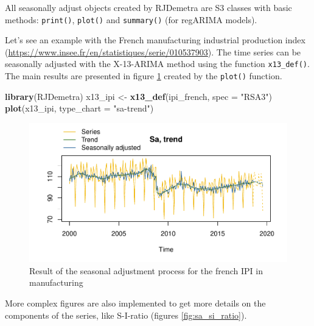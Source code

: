 \documentclass[12pt,a4paper]{article}
\newenvironment{Shaded}{\begin{snugshade}}{\end{snugshade}}
\newcommand{\KeywordTok}[1]{\textcolor[rgb]{0.13,0.29,0.53}{\textbf{#1}}}
\newcommand{\DataTypeTok}[1]{\textcolor[rgb]{0.13,0.29,0.53}{#1}}
\newcommand{\StringTok}[1]{\textcolor[rgb]{0.31,0.60,0.02}{#1}}
\newcommand{\OtherTok}[1]{\textcolor[rgb]{0.56,0.35,0.01}{#1}}
\newcommand{\OperatorTok}[1]{\textcolor[rgb]{0.81,0.36,0.00}{\textbf{#1}}}
\newcommand{\NormalTok}[1]{#1}
\begin{document}
All seasonally adjust objects created by RJDemetra are S3 classes \cite{wickham2014advanced} with basic methods: \texttt{print()}, \texttt{plot()} and
\texttt{summary()} (for regARIMA models).

Let's see an example with the French manufacturing industrial production index
(\url{https://www.insee.fr/en/statistiques/serie/010537903}). The time
series can be seasonally adjusted with the X-13-ARIMA method using the
function \texttt{x13\_def()}. The main results are presented in figure
\ref{fig:sa_ipi} created by the \texttt{plot()} function.

\begin{Shaded}
\begin{Highlighting}[]
\KeywordTok{library}\NormalTok{(RJDemetra)}
\NormalTok{x13_ipi <-}\StringTok{ }\KeywordTok{x13_def}\NormalTok{(ipi_french, }\DataTypeTok{spec =} \StringTok{"RSA3"}\NormalTok{)}
\KeywordTok{plot}\NormalTok{(x13_ipi, }\DataTypeTok{type_chart =} \StringTok{"sa-trend"}\NormalTok{)}
\end{Highlighting}
\end{Shaded}

\begin{figure}[H]
\centering
\includegraphics{NTTS_files/figure-latex/unnamed-chunk-2-1.pdf}
\caption{\label{fig:sa_ipi}Result of the seasonal adjustment process
for the french IPI in manufacturing}
\end{figure}

More complex figures are also implemented to get more details on the
components of the series, like S-I-ratio (figures
\ref{fig:sa_si_ratio}).

\begin{Shaded}
\end{Shaded}%
\end{document}
